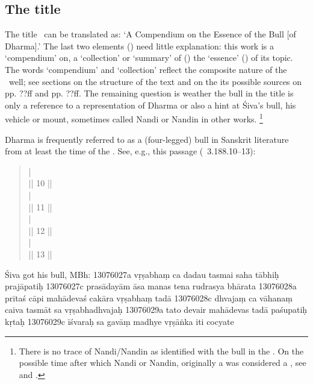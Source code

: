 \documentclass[11pt]{book}
\begin{document}
\subsection{The title}
The title \Vss\ can be translated as:
`A Compendium on the Essence of the Bull [of Dharma].'
The last two elements () need
little explanation: this work is a 
`compendium' on, a `collection' or `summary' of ()
the `essence' () of its topic. The words 
`compendium' and `collection' reflect the composite nature of
the \Vss\ well; see sections on the structure of the text and
on the its possible sources on pp. ??ff and pp. ??ff.
The remaining question is weather the bull in the title 
is only a reference to a representation of Dharma 
or also a hint at Śiva's bull, his vehicle or mount, 
sometimes called Nandi or Nandin in other works.%
		\footnote{There is no trace of Nandi/Nandin 
		as identified with the bull in the \Vss.
		On the possible time after which 
		Nandi or Nandin, originally a  
		was considered a , see 
		 and 
		.}

Dharma is frequently referred to as a (four-legged) 
bull in Sanskrit literature from at least the time of the \MBh. 
See, e.g., this passage (\MBH\ 3.188.10--13):

\begin{quote}
{\small
   |\\
   || 10 ||\\
   |\\
   || 11 ||\\
   |\\
   || 12 ||\\
   |\\
   || 13 ||\\
  }
\end{quote}

Śiva got his bull, MBh:
13076027a vṛṣabhaṃ ca dadau tasmai saha tābhiḥ prajāpatiḥ
13076027c prasādayām āsa manas tena rudrasya bhārata
13076028a prītaś cāpi mahādevaś cakāra vṛṣabhaṃ tadā
13076028c dhvajaṃ ca vāhanaṃ caiva tasmāt sa vṛṣabhadhvajaḥ
13076029a tato devair mahādevas tadā paśupatiḥ kṛtaḥ
13076029c īśvaraḥ sa gavāṃ madhye vṛṣāṅka iti cocyate
\end{document}
